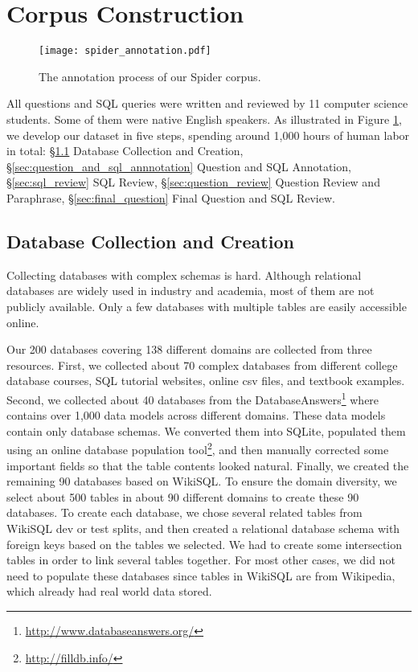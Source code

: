 \documentclass[11pt,a4paper]{article}
\begin{document}
\section{Corpus Construction}
\label{sec:data_collection}
\begin{figure}[t!]
\centering
\texttt{[image: spider\_annotation.pdf]}\vspace{-2mm}
\caption{The annotation process of our Spider corpus.}
\label{fig:annotation}\vspace{-3mm}
\end{figure}
All questions and SQL queries were written and reviewed by 11 computer science students. Some of them were native English speakers.
As illustrated in Figure \ref{fig:annotation}, we develop our dataset in five steps, spending around 1,000 hours of human labor in total: \S \ref{sec:database_collection} Database Collection and Creation, \S \ref{sec:question_and_sql_annnotation} Question and SQL Annotation, \S \ref{sec:sql_review} SQL Review, \S \ref{sec:question_review} Question Review and Paraphrase, \S \ref{sec:final_question} Final Question and SQL Review.


\subsection{Database Collection and Creation}
\label{sec:database_collection}
Collecting databases with complex schemas is hard. Although relational databases are widely used in industry and academia, most of them are not publicly available. Only a few databases with multiple tables are easily accessible online.

Our 200 databases covering 138 different domains are collected from three resources. First, we collected about 70 complex databases from different college database courses, SQL tutorial websites, online csv files, and textbook examples. Second, we collected about 40 databases from the DatabaseAnswers\footnote{\url{http://www.databaseanswers.org/}} where contains over 1,000 data models across different domains. These data models contain only database schemas. We converted them into SQLite, populated them using an online database population tool\footnote{\url{http://filldb.info/}}, and then manually corrected some important fields so that the table contents looked natural. Finally, we created the remaining 90 databases based on WikiSQL. To ensure the domain diversity, we select about 500 tables in about 90 different domains to create these 90 databases. To create each database, we chose several related tables from WikiSQL dev or test splits, and then created a relational database schema with foreign keys based on the tables we selected. We had to create some intersection tables in order to link several tables together. For most other cases, we did not need to populate these databases since tables in WikiSQL are from Wikipedia, which already had real world data stored.
\end{document}
